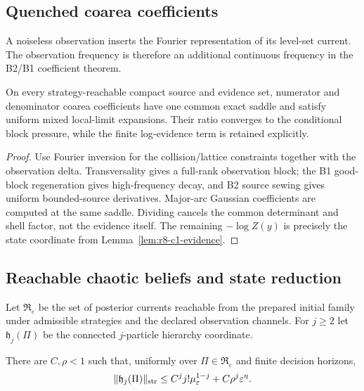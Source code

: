 \subsection{Quenched coarea coefficients}

A noiseless observation inserts the Fourier representation of its level-set
current.  The observation frequency is therefore an additional continuous
frequency in the B2/B1 coefficient theorem.

\begin{theorem}
\label{thm:r8-c1-ratio}
On every strategy-reachable compact source and evidence set, numerator and
denominator coarea coefficients have one common exact saddle and satisfy
uniform mixed local-limit expansions.  Their ratio converges to the conditional
block pressure, while the finite log-evidence term is retained explicitly.
\end{theorem}

\begin{proof}
Use Fourier inversion for the collision/lattice constraints together with the
observation delta.  Transversality gives a full-rank observation block; the B1
good-block regeneration gives high-frequency decay, and B2 source sewing gives
uniform bounded-source derivatives.  Major-arc Gaussian coefficients are
computed at the same saddle.  Dividing cancels the common determinant and shell
factor, not the evidence itself.  The remaining $-\log Z(y)$ is precisely the
state coordinate from Lemma~\ref{lem:r8-c1-evidence}.
\end{proof}

\subsection{Reachable chaotic beliefs and state reduction}

Let $\mathfrak R_\varepsilon$ be the set of posterior currents reachable from
the prepared initial family under admissible strategies and the declared
observation channels.  For $j\ge2$ let $\mathfrak h_j(\Pi)$ be the connected
$j$-particle hierarchy coordinate.

\begin{lemma}
\label{lem:r8-c1-chaos}
There are $C,\rho<1$ such that, uniformly over
$\Pi\in\mathfrak R_\varepsilon$ and finite decision horizons,
\[
 \|\mathfrak h_j(\Pi)\|_{\rm str}
 \le C^j j!\mu_\varepsilon^{1-j}+C\rho^j\varepsilon^\eta.
\]
\end{lemma}

